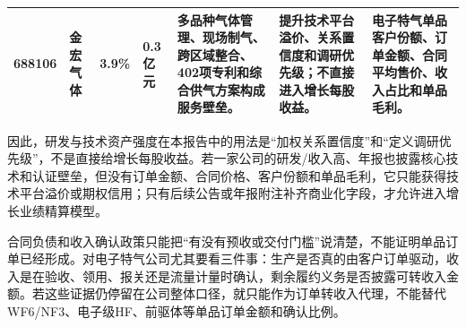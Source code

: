 \begin{exhibitbox}[研发与技术资产强度（2）]
\begin{tabularx}{\exhibitboxwidth}{L{0.8cm} L{1.1cm} L{1.0cm} L{1.0cm} X X X}
688106 & 金宏气体 & 3.9\% & 0.3亿元 & 多品种气体管理、现场制气、跨区域整合、402项专利和综合供气方案构成服务壁垒。 & 提升技术平台溢价、关系置信度和调研优先级；不直接进入增长每股收益。 & 电子特气单品客户份额、订单金额、合同平均售价、收入占比和单品毛利。 \\
\bottomrule
\end{tabularx}
\end{exhibitbox}


因此，研发与技术资产强度在本报告中的用法是“加权关系置信度”和“定义调研优先级”，不是直接给增长每股收益。若一家公司的研发/收入高、年报也披露核心技术和认证壁垒，但没有订单金额、合同价格、客户份额和单品毛利，它只能获得技术平台溢价或期权信用；只有后续公告或年报附注补齐商业化字段，才允许进入增长业绩精算模型。

合同负债和收入确认政策只能把“有没有预收或交付门槛”说清楚，不能证明单品订单已经形成。对电子特气公司尤其要看三件事：生产是否真的由客户订单驱动，收入是在验收、领用、报关还是流量计量时确认，剩余履约义务是否披露可转收入金额。若这些证据仍停留在公司整体口径，就只能作为订单转收入代理，不能替代WF6/NF3、电子级HF、前驱体等单品订单金额和确认比例。

